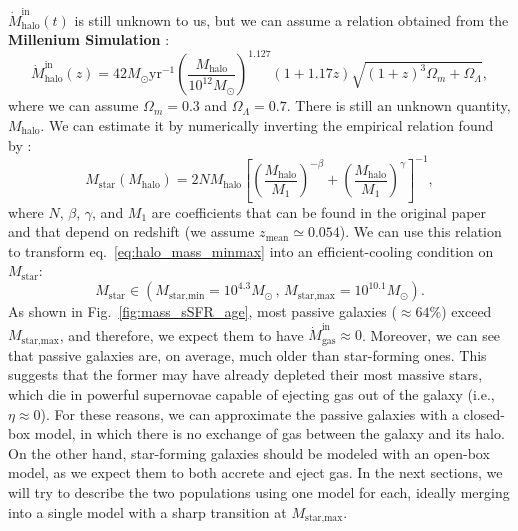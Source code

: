 \documentclass[fleqn,usenatbib]{mnras}
\begin{document}
$\dot{M}_\text{halo}^\text{in}(t)$ is still unknown to us, but we can assume a relation obtained from the \textbf{Millenium Simulation} \citep{McBride_2009}:
{\fontsize{7.9pt}{7.9pt}\begin{equation}
    \dot{M}_\text{halo}^\text{in}(z) = 42 M_{\odot} \text{yr}^{-1} \left(\dfrac{M_\text{halo}}{10^{12}M_{\odot}}\right)^{1.127} (1+1.17z) \sqrt{(1+z)^3 \Omega_m + \Omega_\Lambda},
	\label{eq:mcbride}
\end{equation}}
where we can assume $\Omega_m=0.3$ and $\Omega_\Lambda=0.7$.
There is still an unknown quantity, $M_\text{halo}$. We can estimate it by numerically inverting the empirical relation found by \citet{Moster_2012}:
\begin{equation}
    M_\text{star} \left(M_\text{halo}\right) = 2N M_\text{halo} \left[\left(\dfrac{M_\text{halo}}{M_1}\right)^{-\beta} + \left(\dfrac{M_\text{halo}}{M_1}\right)^\gamma\right]^{-1},
	\label{eq:moster}
\end{equation}
where $N$, $\beta$, $\gamma$, and $M_1$ are coefficients that can be found in the original paper and that depend on redshift (we assume $z_{\text{mean}} \simeq 0.054$). We can use this relation to transform eq.~\ref{eq:halo_mass_minmax} into an efficient-cooling condition on $M_\text{star}$:
\begin{equation}
    M_\text{star} \in \left( M_\text{star,min}=10^{4.3} M_\odot \, , \, M_\text{star,max}=10^{10.1} M_\odot \right).
	\label{eq:star_mass_minmax}
\end{equation}
As shown in Fig.~\ref{fig:mass_sSFR_age}, most passive galaxies ($\approx 64\%$) exceed $M_\text{star,max}$, and therefore, we expect them to have $\dot{M}_\text{gas}^\text{in} \approx 0$.
Moreover, we can see that passive galaxies are, on average, much older than star-forming ones. This suggests that the former may have already depleted their most massive stars, which die in powerful supernovae capable of ejecting gas out of the galaxy (i.e., $\eta \approx 0$). For these reasons, we can approximate the passive galaxies with a closed-box model, in which there is no exchange of gas between the galaxy and its halo. On the other hand, star-forming galaxies should be modeled with an open-box model, as we expect them to both accrete and eject gas. In the next sections, we will try to describe the two populations using one model for each, ideally merging into a single model with a sharp transition at $M_\text{star,max}$.


\end{document}
